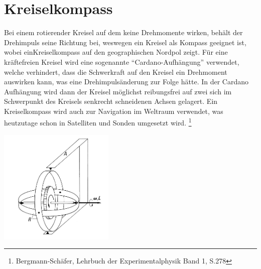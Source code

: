 

\section{Kreiselkompass}
Bei einem rotierender Kreisel auf dem keine Drehmomente wirken, behält der Drehimpuls seine Richtung bei, weswegen ein Kreisel als Kompass geeignet ist, wobei einKreiselkompass auf den geographischen Nordpol zeigt. Für eine kräftefreien Kreisel wird eine sogenannte \enquote{Cardano-Aufhängung} verwendet, welche verhindert, dass die Schwerkraft auf den Kreisel ein Drehmoment auswirken kann, was eine Drehimpulsänderung zur Folge hätte. In der Cardano Aufhängung wird dann der Kreisel möglichst reibungsfrei auf zwei sich im Schwerpunkt des Kreisels senkrecht schneidenen Achsen gelagert. Ein Kreiselkompass wird auch zur Navigation im Weltraum verwendet, was heutzutage schon in Satelliten und Sonden umgesetzt wird. \footnote{Bergmann-Schäfer, Lehrbuch der Experimentalphysik Band 1, S.278}
\begin{center}
    \includegraphics[width = 5.5cm]{Bilder/Kraeftefreie_Aufhaengung.PNG}
\end{center}